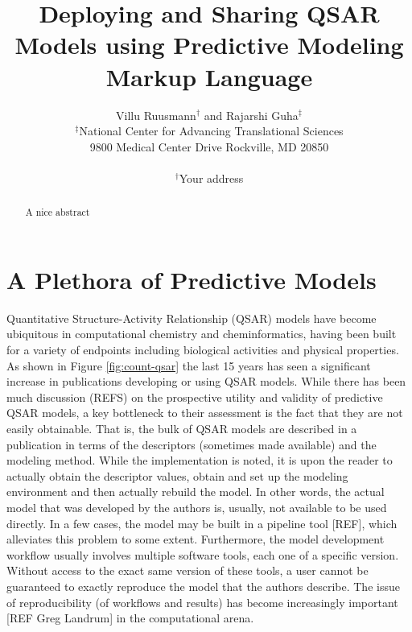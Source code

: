 \documentclass[12pt,letterpaper]{article}
\begin{document}
\title{Deploying and Sharing QSAR Models using Predictive Modeling Markup Language}
\author{Villu Ruusmann${}^{\dagger}$ and Rajarshi Guha${}^{\ddagger}$\\
${}^{\ddagger}$National Center for Advancing Translational Sciences\\ 9800 Medical Center Drive  Rockville, MD 20850 \\ \\
${}^{\dagger}$Your address }
\date{}
\maketitle
\begin{abstract}
  A nice abstract
\end{abstract}

\section{A Plethora of Predictive Models}
\label{sec:introduction}

Quantitative Structure-Activity Relationship (QSAR) models have become
ubiquitous in computational chemistry and cheminformatics, having been
built for a variety of endpoints including biological activities and
physical properties. As shown in Figure \ref{fig:count-qsar} the last
15 years has seen a significant increase in publications developing or
using QSAR models. While there has been much discussion (REFS) on the
prospective utility and validity of predictive QSAR models, a key
bottleneck to their assessment is the fact that they are not easily
obtainable. That is, the bulk of QSAR models are described in a
publication in terms of the descriptors (sometimes made available) and
the modeling method. While the implementation is noted, it is upon the
reader to actually obtain the descriptor values, obtain and set up the
modeling environment and then actually rebuild the model. In other
words, the actual model that was developed by the authors is, usually,
not available to be used directly. In a few cases, the model may be
built in a pipeline tool [REF], which alleviates this problem to some
extent. Furthermore, the model development workflow usually involves
multiple software tools, each one of a specific version. Without
access to the exact same version of these tools, a user cannot be
guaranteed to exactly reproduce the model that the authors
describe. The issue of reproducibility (of workflows and results) has
become increasingly important [REF Greg Landrum] in the computational
arena.
\end{document}
